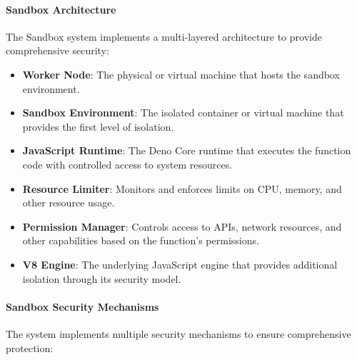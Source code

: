 \paragraph{Sandbox Architecture}
The Sandbox system implements a multi-layered architecture to provide comprehensive security:

\begin{itemize}
    \item \textbf{Worker Node}: The physical or virtual machine that hosts the sandbox environment.
    
    \item \textbf{Sandbox Environment}: The isolated container or virtual machine that provides the first level of isolation.
    
    \item \textbf{JavaScript Runtime}: The Deno Core runtime that executes the function code with controlled access to system resources.
    
    \item \textbf{Resource Limiter}: Monitors and enforces limits on CPU, memory, and other resource usage.
    
    \item \textbf{Permission Manager}: Controls access to APIs, network resources, and other capabilities based on the function's permissions.
    
    \item \textbf{V8 Engine}: The underlying JavaScript engine that provides additional isolation through its security model.
\end{itemize}

\paragraph{Sandbox Security Mechanisms}
The system implements multiple security mechanisms to ensure comprehensive protection:

